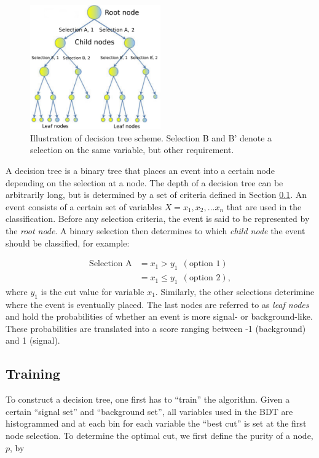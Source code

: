 \begin{figure}[t]
\centering
\includegraphics[width=0.5\textwidth]{chapter7/img/bdt.png}
\caption{Illustration of decision tree scheme. Selection B and B' denote a selection on the same variable, but other requirement.}
\label{fig:bdt}
\end{figure}
A decision tree is a binary tree that places an event into a certain node depending on the selection at a node. The depth of a decision tree can be arbitrarily long, but is determined by a set of criteria defined in Section \ref{subsec:training}. An event consists of a certain set of variables $X = {x_1,x_2,...x_n}$ that are used in the classification. Before any selection criteria, the event is said to be represented by the \textit{root node}. A binary selection then determines to which \textit{child node} the event should be classified, for example: 

\begin{equation}
\begin{split}
\textrm{Selection A} &= x_1 > y_1 \ \ (\textrm{option 1})\\
&= x_1 \leq y_1 \ \ (\textrm{option 2}),
\end{split}
\end{equation}
where $y_1$ is the cut value for variable $x_1$. Similarly, the other selections deterimine where the event is eventually placed. The last nodes are referred to as \textit{leaf nodes} and hold the probabilities of whether an event is more signal- or background-like. These probabilities are translated into a score ranging between -1 (background) and 1 (signal). 

\subsection{Training}
\label{subsec:training}
To construct a decision tree, one first has to ``train'' the algorithm. Given a certain ``signal set'' and ``background set'', all variables used in the BDT are histogrammed and at each bin for each variable the ``best cut'' is set at the first node selection. To determine the optimal cut, we first define the purity of a node, $p$, by

